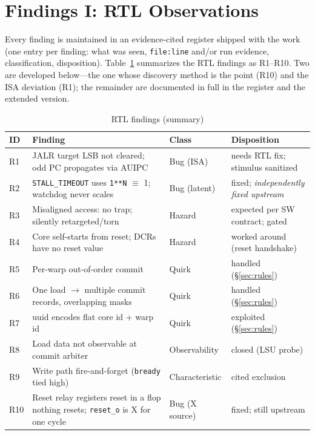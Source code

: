 \documentclass[conference]{IEEEtran}
\newcommand{\code}[1]{\texttt{\small #1}}
\begin{document}
\section{Findings I: RTL Observations}
\label{sec:rtlfindings}

Every finding is maintained in an evidence-cited register shipped with
the work (one entry per finding: what was seen, \code{file:line} and/or
run evidence, classification, disposition). Table~\ref{tab:rtlobs}
summarizes the RTL findings as R1--R10. Two are developed below---the
one whose discovery method is the point (R10) and the ISA deviation
(R1); the remainder are documented in full in the register and the
extended version.

\begin{table}[t]
\caption{RTL findings (summary)}
\label{tab:rtlobs}
\centering
\scriptsize
\begin{tabular}{p{0.5cm}p{3.6cm}p{1.2cm}p{1.6cm}}
\toprule
ID & Finding & Class & Disposition \\
\midrule
R1 & JALR target LSB not cleared; odd PC propagates via AUIPC & Bug (ISA) & needs RTL fix; stimulus sanitized \\
R2 & \code{STALL\_TIMEOUT} uses \code{1**N} $\equiv$ 1; watchdog never scales & Bug (latent) & fixed; \emph{independently fixed upstream} \\
R3 & Misaligned access: no trap; silently retargeted/torn & Hazard & expected per SW contract; gated \\
R4 & Core self-starts from reset; DCRs have no reset value & Hazard & worked around (reset handshake) \\
R5 & Per-warp out-of-order commit & Quirk & handled (\S\ref{sec:rules}) \\
R6 & One load $\to$ multiple commit records, overlapping masks & Quirk & handled (\S\ref{sec:rules}) \\
R7 & uuid encodes flat core id + warp id & Quirk & exploited (\S\ref{sec:rules}) \\
R8 & Load data not observable at commit arbiter & Observability & closed (LSU probe) \\
R9 & Write path fire-and-forget (\code{bready} tied high) & Characteristic & cited exclusion \\
R10 & Reset relay registers reset in a flop nothing resets; \code{reset\_o} is X for one cycle & Bug (X source) & fixed; still upstream \\
\bottomrule
\end{tabular}
\end{table}
\end{document}
